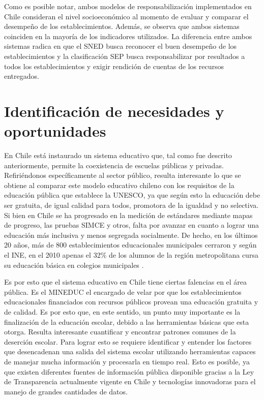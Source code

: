 \begin{description}
Como es posible notar, ambos modelos de responsabilización implementados en Chile consideran el nivel socioeconómico al momento de evaluar y comparar el desempeño de los establecimientos. Además, se observa que ambos sistemas coinciden en la mayoría de los indicadores utilizados. La diferencia entre ambos sistemas radica en que el SNED busca reconocer el buen desempeño de los establecimientos y la clasificación SEP busca responsabilizar por resultados a todos los establecimientos y exigir rendición de cuentas de los recursos entregados.

\section{Identificación de necesidades y oportunidades}
En Chile está instaurado un sistema educativo que, tal como fue descrito anteriormente, permite la coexistencia de escuelas públicas y privadas. Refiriéndonos específicamente al sector público, resulta interesante lo que se obtiene al comparar este modelo educativo chileno con los requisitos de la educación pública que establece la UNESCO, ya que según esto la educación debe ser gratuita, de igual calidad para todos, promotora de la igualdad y no selectiva. Si bien en Chile se ha progresado en la medición de estándares mediante mapas de progreso, las pruebas SIMCE y otros, falta por avanzar en cuanto a lograr una educación más inclusiva y menos segregada socialmente. De hecho, en los últimos 20 años, más de 800 establecimientos educacionales municipales cerraron \cite{biobio} y según el INE, en el 2010 apenas el 32\% de los alumnos de la región metropolitana cursa su educación básica en colegios municipales \cite{ine}. 

Es por esto que el sistema educativo en Chile tiene ciertas falencias en el área pública. Es el MINEDUC el encargado de velar por que los establecimientos educacionales financiados con recursos públicos provean una educación gratuita y de calidad. Es por esto que, en este sentido, un punto muy importante es la finalización de la educación escolar, debido a las herramientas básicas que esta otorga. Resulta interesante cuantificar y encontrar patrones comunes de la deserción escolar. Para lograr esto se requiere identificar y entender los factores que desencadenan una salida del sistema escolar utilizando herramientas capaces de manejar mucha información y procesarla en tiempo real. Esto es posible, ya que existen diferentes fuentes de información pública disponible gracias a la Ley de Transparencia \cite{ley} actualmente vigente en Chile y tecnologías innovadoras para el manejo de grandes cantidades de datos.


\end{description}
